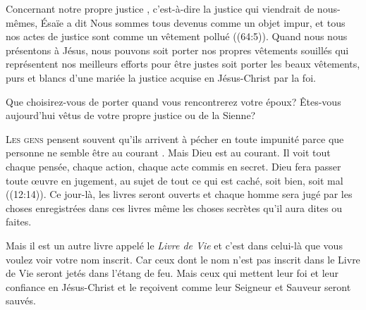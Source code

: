 
Concernant notre \Og propre justice \Fg{}, c'est-à-dire la justice
 qui viendrait de nous-mêmes, Ésaïe a dit\frcolon{} 
 \Og Nous sommes tous devenus comme un objet impur,
 et tous nos actes de justice sont comme un vêtement pollué \Fg{}
 ((64:5)). Quand nous nous présentons à Jésus,
 nous pouvons soit porter nos propres vêtements souillés
 \ocadr qui représentent nos meilleurs efforts pour être justes \fcadr{}
 soit porter les beaux vêtements, purs et blancs d'une mariée
 \ocadr la justice acquise en Jésus-Christ par la foi. 

Que choisirez-vous de porter quand vous rencontrerez votre époux?
 Êtes-vous aujourd'hui vêtus de votre propre justice ou de la Sienne? 

\dvrule






\lettrine{L}{es gens} pensent souvent qu'ils arrivent à pécher
 en toute impunité parce que personne ne semble être au courant
 .
 Mais Dieu est au courant. Il voit tout \ocadr chaque pensée,
 chaque action, chaque acte commis en secret.
 \Og Dieu fera passer toute \oe{}uvre en jugement,
 au sujet de tout ce qui est caché, soit bien, soit mal \Fg{}
 ((12:14)).
 Ce jour-là, les livres seront ouverts et chaque homme
 sera jugé par les choses enregistrées dans ces livres
 \ocadr même les choses secrètes qu'il aura dites ou faites. 

Mais il est un autre livre appelé le \emph{Livre de Vie}
 et c'est dans celui-là que vous voulez voir votre nom inscrit.
 Car ceux dont le nom n'est pas inscrit dans le Livre de Vie
 seront jetés dans l'étang de feu.
 Mais ceux qui mettent leur foi et leur confiance en Jésus-Christ
 et le re\c{c}oivent comme leur Seigneur et Sauveur seront sauvés. 

